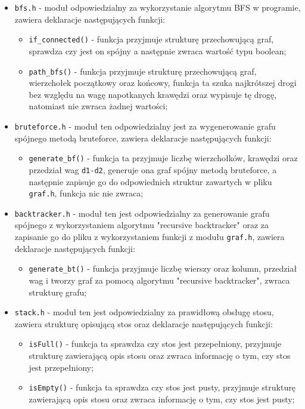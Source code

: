 \documentclass[]{article}
\begin{document}
\begin{itemize}
\begin{itemize}
\end{itemize}
\item
\texttt{bfs.h} - moduł odpowiedzialny za wykorzystanie algorytmu BFS w programie, zawiera deklaracje następujących funkcji:
\begin{itemize}
\item
\verb|if_connected()| - funkcja przyjmuje strukturę przechowującą graf, sprawdza czy jest on spójny a następnie zwraca wartość typu boolean;
\item
\verb|path_bfs()| - funkcja przyjmuje strukturę przechowującą graf, wierzchołek początkowy oraz końcowy, funkcja ta szuka najkrótszej drogi bez względu na wagę napotkanych krawędzi oraz wypisuje tę drogę, natomiast nie zwraca żadnej wartości;
\end{itemize}
\item
\texttt{bruteforce.h} - moduł ten odpowiedzialny jest za wygenerowanie grafu spójnego metodą bruteforce, zawiera deklaracje następujących funkcji:
\begin{itemize}
\item
\verb|generate_bf()| - funkcja ta przyjmuje liczbę wierzchołków, krawędzi oraz przedział wag \texttt{d1-d2}, generuje ona graf spójny metodą bruteforce, a następnie zapisuje go do odpowiednich struktur zawartych w pliku \texttt{graf.h}, funkcja nic nie zwraca;
\end{itemize} 
\item
\texttt{backtracker.h} - moduł ten jest odpowiedzialny za generowanie grafu spójnego z wykorzystaniem algorytmu "recursive backtracker" oraz za zapisanie go do pliku z wykorzystaniem funkcji z modułu \texttt{graf.h}, zawiera deklaracje następujących funkcji:
\begin{itemize}
\item
\verb|generate_bt()| - funkcja przyjmuje liczbę wierszy oraz kolumn, przedział wag i tworzy graf za pomocą algorytmu "recursive backtracker", zwraca strukturę grafu;
\end{itemize}
\item
\texttt{stack.h} - moduł ten jest odpowiedzialny za prawidłową obsługę stosu, zawiera strukturę opisującą stos oraz deklaracje następujących funkcji:
\begin{itemize}
\item
\texttt{isFull()} - funkcja ta sprawdza czy stos jest przepełniony, przyjmuje strukturę zawierającą opis stosu oraz zwraca informację o tym, czy stos jest przepełniony;
\item
\texttt{isEmpty()} - funkcja ta sprawdza czy stos jest pusty, przyjmuje strukturę zawierającą opis stosu oraz zwraca informację o tym, czy stos jest pusty;

\end{itemize}
\end{itemize}
\end{document}
